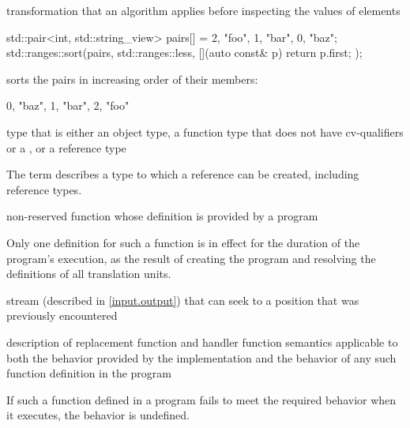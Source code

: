 %
transformation that an algorithm applies
before inspecting the values of elements

\begin{example}
\begin{codeblock}
std::pair<int, std::string_view> pairs[] = {{2, "foo"}, {1, "bar"}, {0, "baz"}};
std::ranges::sort(pairs, std::ranges::less{}, [](auto const& p) { return p.first; });
\end{codeblock}
sorts the pairs in increasing order of their  members:
\begin{codeblock}
{{0, "baz"}, {1, "bar"}, {2, "foo"}}
\end{codeblock}
\end{example}

%
type that is either an
object type, a function type that does not have cv-qualifiers or a
, or a reference type

\begin{defnote}
The term describes a type to which a reference can be created,
including reference types.
\end{defnote}

%
non-reserved function
whose definition is provided by a \Cpp{} program

\begin{defnote}
Only one definition for such a function is in effect for the duration of the program's
execution, as the result of creating the program and resolving the
definitions of all translation units.
\end{defnote}

%
stream (described in \ref{input.output}) that can seek to a position that was
previously encountered

%
description of replacement function and handler function semantics
applicable to both the behavior provided by the implementation and
the behavior of any such function definition in the program

\begin{defnote}
If such a function defined in a \Cpp{} program fails to meet the required
behavior when it executes, the behavior is undefined.%
\end{defnote}

